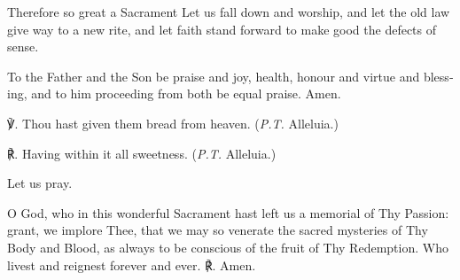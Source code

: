 \begin{otherlanguage}{english}Therefore so great a Sacrament
Let us fall down and worship,
and let the old law
give way to a new rite,
and let faith stand forward
to make good the defects of sense.

To the Father and the Son be praise and joy,
health, honour and virtue and blessing,
and to him proceeding from both
be equal praise.
Amen.

℣. Thou hast given them bread from heaven. (\textit{P.T.} Alleluia.)

℟. Having within it all sweetness. (\textit{P.T.} Alleluia.)

Let us pray.

O God, who in this wonderful Sacrament hast left us a memorial of Thy Passion: grant, we implore Thee, that we may so venerate the sacred mysteries of Thy Body and Blood, as always to be conscious of the fruit of Thy Redemption. Who livest and reignest forever and ever. ℟. Amen.\end{otherlanguage}
